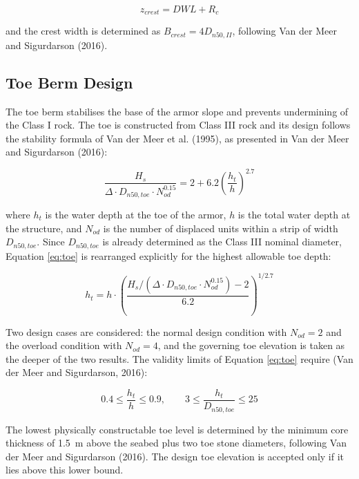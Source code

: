 \documentclass[a4paper, 11pt]{article}
\begin{document}
\begin{equation}
    z_{crest} = DWL + R_c
    \label{eq:zcrest}
\end{equation}

and the crest width is determined as $B_{crest} = 4 D_{n50,II}$, following Van der Meer and Sigurdarson (2016).

\subsection{Toe Berm Design}
\hspace{0.5cm}The toe berm stabilises the base of the armor slope and prevents undermining of the Class I rock. The toe is constructed from Class III rock and its design follows the stability formula of Van der Meer et al. (1995), as presented in Van der Meer and Sigurdarson (2016):

\begin{equation}
    \frac{H_s}{\Delta \cdot D_{n50,toe} \cdot N_{od}^{0.15}} = 2 + 6.2 \left(\frac{h_t}{h}\right)^{2.7}
    \label{eq:toe}
\end{equation}

where $h_t$ is the water depth at the toe of the armor, $h$ is the total water depth at the structure, and $N_{od}$ is the number of displaced units within a strip of width $D_{n50,toe}$. Since $D_{n50,toe}$ is already determined as the Class III nominal diameter, Equation \ref{eq:toe} is rearranged explicitly for the highest allowable toe depth:

\begin{equation}
    h_t = h \cdot \left(\frac{H_s / (\Delta \cdot D_{n50,toe} \cdot N_{od}^{0.15}) - 2}{6.2}\right)^{1/2.7}
    \label{eq:ht}
\end{equation}

Two design cases are considered: the normal design condition with $N_{od} = 2$ and the overload condition with $N_{od} = 4$, and the governing toe elevation is taken as the deeper of the two results. The validity limits of Equation \ref{eq:toe} require (Van der Meer and Sigurdarson, 2016):

\begin{equation}
    0.4 \leq \frac{h_t}{h} \leq 0.9, \qquad 3 \leq \frac{h_t}{D_{n50,toe}} \leq 25
    \label{eq:toe_validity}
\end{equation}

The lowest physically constructable toe level is determined by the minimum core thickness of 1.5~m above the seabed plus two toe stone diameters, following Van der Meer and Sigurdarson (2016). The design toe elevation is accepted only if it lies above this lower bound.
\end{document}
